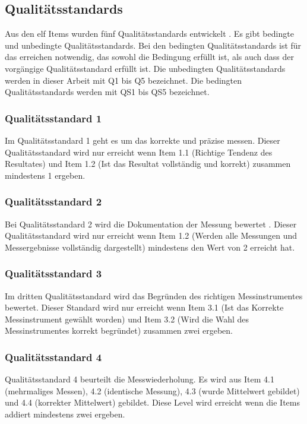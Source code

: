 \subsection{Qualitätsstandards}
Aus den elf Items wurden fünf Qualitätsstandards entwickelt \citep{Hild2014a}. Es gibt bedingte und unbedingte Qualitätsstandards. Bei den bedingten Qualitätsstandards ist für das erreichen notwendig, das sowohl die Bedingung erfüllt ist, als auch dass der vorgängige Qualitätsstandard erfüllt ist. Die unbedingten Qualitätsstandards werden in dieser Arbeit mit Q1 bis Q5 bezeichnet. Die bedingten Qualitätsstandards werden mit QS1 bis QS5 bezeichnet.
\subsubsection*{Qualitätsstandard 1}
Im Qualitätsstandard 1 geht es um das korrekte und präzise messen. Dieser Qualitätsstan\-dard wird nur erreicht wenn Item 1.1 (Richtige Tendenz des Resultates) und Item 1.2 (Ist das Resultat vollständig und korrekt) zusammen mindestens 1 ergeben.


\subsubsection*{Qualitätsstandard 2}
Bei Qualitätsstandard 2 wird die Dokumentation der Messung bewertet . Dieser Qualitätsstandard wird nur erreicht wenn Item 1.2 (Werden alle Messungen und Messergebnisse vollständig dargestellt) mindestens den Wert von 2 erreicht hat. 

\subsubsection*{Qualitätsstandard 3}
Im dritten Qualitätsstandard wird das Begründen des richtigen Messinstrumentes bewertet. Dieser Standard wird nur erreicht wenn Item 3.1 (Ist das Korrekte Messinstrument gewählt worden) und Item 3.2 (Wird die Wahl des Messinstrumentes korrekt begründet) zusammen zwei ergeben.

\subsubsection*{Qualitätsstandard 4}
Qualitätsstandard 4 beurteilt die Messwiederholung. Es wird aus Item 4.1 (mehrmaliges Messen), 4.2 (identische Messung), 4.3 (wurde Mittelwert gebildet) und 4.4 (korrekter Mittelwert) gebildet. Diese Level wird erreicht wenn die Items addiert mindestens zwei ergeben.

